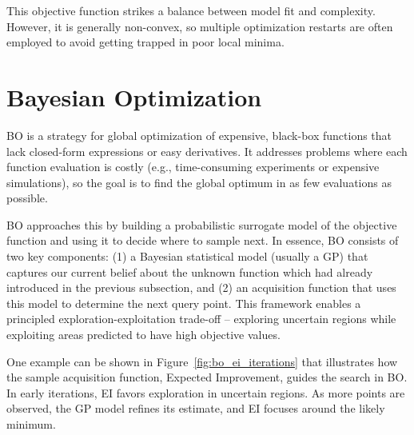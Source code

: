 \documentclass{ut-thesis}
\begin{document}
This objective function strikes a balance between model fit and complexity. However, it is generally non-convex, so multiple optimization restarts are often employed to avoid getting trapped in poor local minima.


\section{Bayesian Optimization}

BO is a strategy for global optimization of expensive, black-box functions that lack closed-form expressions or easy derivatives\cite{garnett2023bayesian}\cite{frazier2018tutorial}. It addresses problems where each function evaluation is costly (e.g., time-consuming experiments or expensive simulations), so the goal is to find the global optimum in as few evaluations as possible. 

BO approaches this by building a probabilistic surrogate model of the objective function and using it to decide where to sample next. In essence, BO consists of two key components: (1) a Bayesian statistical model (usually a GP) that captures our current belief about the unknown function which had already introduced in the previous subsection, and (2) an acquisition function that uses this model to determine the next query point. This framework enables a principled exploration-exploitation trade-off – exploring uncertain regions while exploiting areas predicted to have high objective values.

One example can be shown in Figure~\ref{fig:bo_ei_iterations} that illustrates how the sample acquisition function, Expected Improvement, guides the search in BO. In early iterations, EI favors exploration in uncertain regions. As more points are observed, the GP model refines its estimate, and EI focuses around the likely minimum.
\end{document}

